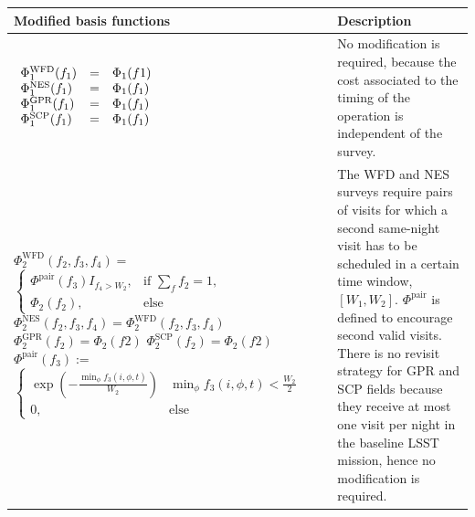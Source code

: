 \documentclass[12pt,aas_macros]{article}
\theoremstyle{definition}
\begin{document}
\begin{table}[h!]\label{tab_regionBF}
\begin{tabularx}{\textwidth}{| X | X |}
\hline
Modified basis functions & Description\\ \hline \hline

$\begin{array}{l c l}\Phi_1^{\text{WFD}}(f_1) &=& \Phi_1(f1)\\ \Phi_1^{\text{NES}}(f_1) &=&\Phi_1(f_1)\\ \Phi_1^{\text{GPR}}(f_1) &=& \Phi_1(f_1)\\\Phi_1^{\text{SCP}}(f_1) &=&\Phi_1(f_1)\end{array}$  

& No modification is required, because the cost associated to the timing of the operation is independent of the survey.\\ \hline

$\Phi_2^{\text{WFD}}(f_2,f_3,f_4) =$ \newline $\begin{cases} \Phi^{\text{pair}}(f_3)I_{f_4> W_2},& \text{if } \sum\limits_{f}{f_2} = 1,\\ \Phi_2(f_2),& \text{else } \end{cases}$ \newline\newline $\Phi_2^{\text{NES}}(f_2,f_3,f_4) =\Phi_2^{\text{WFD}}(f_2,f_3,f_4)$ \newline\newline $\Phi_2^{\text{GPR}}(f_2) = \Phi_2(f2)$ \newline\newline $\Phi_2^{\text{SCP}}(f_2) = \Phi_2(f2)$\newline\newline $\Phi^{\text{pair}}(f_3) :=$ \newline $\begin{cases} \exp(- \frac{\min_{\phi}f_3(i,\phi,t)}{W_2})& \min_{\phi}f_3(i,\phi,t) < \frac{W_2}{2}\\ 0, & \text{else}\end{cases}$ 

& The WFD and NES surveys require pairs of visits for which a second same-night visit has to be scheduled in a certain time window, $[W_1,W_2]$. $ \Phi^{\text{pair}}$ is defined to encourage second valid visits. There is no revisit strategy for GPR and SCP fields because they receive at most one visit per night in the baseline LSST mission, hence no modification is required.\\ \hline



\end{tabularx}
\end{table}
\end{document}

